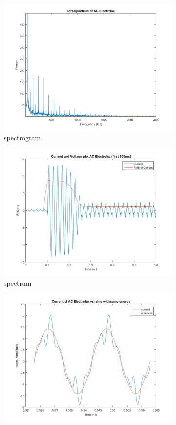 \documentclass[portrait,a0b,posterdraft]{a0poster}
\begin{document}
\begin{figure}
\begin{subfigure}{.1\textwidth}
\includegraphics[width=\linewidth]{AC_Electrolux_spectrum.png}
\caption{spectrogram}
\end{subfigure}
\begin{subfigure}{.1\textwidth}
\centering
\includegraphics[width=\linewidth]{AC_Electrolux_timeDomainShort.png}
\caption{spectrum}
\end{subfigure}
\begin{subfigure}{.1\textwidth}
\centering
\includegraphics[width=\linewidth]{AC_Electrolux_waveform.png}

\end{subfigure}
\end{figure}
\end{document}
